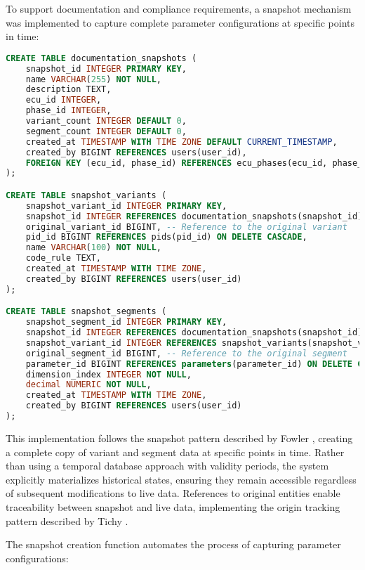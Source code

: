 To support documentation and compliance requirements, a snapshot mechanism was implemented to capture complete parameter configurations at specific points in time:

\begin{lstlisting}[language=SQL, caption={Documentation Snapshot Implementation}, label={lst:documentation-snapshot}]
CREATE TABLE documentation_snapshots (
    snapshot_id INTEGER PRIMARY KEY,
    name VARCHAR(255) NOT NULL,
    description TEXT,
    ecu_id INTEGER,
    phase_id INTEGER,
    variant_count INTEGER DEFAULT 0,
    segment_count INTEGER DEFAULT 0,
    created_at TIMESTAMP WITH TIME ZONE DEFAULT CURRENT_TIMESTAMP,
    created_by BIGINT REFERENCES users(user_id),
    FOREIGN KEY (ecu_id, phase_id) REFERENCES ecu_phases(ecu_id, phase_id)
);

CREATE TABLE snapshot_variants (
    snapshot_variant_id INTEGER PRIMARY KEY,
    snapshot_id INTEGER REFERENCES documentation_snapshots(snapshot_id) ON DELETE CASCADE,
    original_variant_id BIGINT, -- Reference to the original variant
    pid_id BIGINT REFERENCES pids(pid_id) ON DELETE CASCADE,
    name VARCHAR(100) NOT NULL,
    code_rule TEXT,
    created_at TIMESTAMP WITH TIME ZONE,
    created_by BIGINT REFERENCES users(user_id)
);

CREATE TABLE snapshot_segments (
    snapshot_segment_id INTEGER PRIMARY KEY,
    snapshot_id INTEGER REFERENCES documentation_snapshots(snapshot_id) ON DELETE CASCADE,
    snapshot_variant_id INTEGER REFERENCES snapshot_variants(snapshot_variant_id) ON DELETE CASCADE,
    original_segment_id BIGINT, -- Reference to the original segment
    parameter_id BIGINT REFERENCES parameters(parameter_id) ON DELETE CASCADE,
    dimension_index INTEGER NOT NULL,
    decimal NUMERIC NOT NULL,
    created_at TIMESTAMP WITH TIME ZONE,
    created_by BIGINT REFERENCES users(user_id)
);
\end{lstlisting}

This implementation follows the snapshot pattern described by Fowler \cite{fowler2003patterns}, creating a complete copy of variant and segment data at specific points in time. Rather than using a temporal database approach with validity periods, the system explicitly materializes historical states, ensuring they remain accessible regardless of subsequent modifications to live data. References to original entities enable traceability between snapshot and live data, implementing the origin tracking pattern described by Tichy \cite{tichy1985rcs}.

The snapshot creation function automates the process of capturing parameter configurations:

